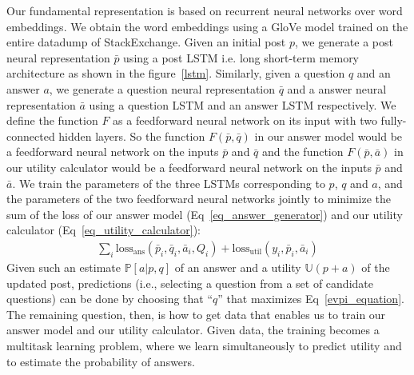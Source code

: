 \documentclass[11pt]{article}
\newcommand{\U}{\mathbb{U}}
\begin{document}
Our fundamental representation is based on recurrent neural networks over word embeddings. We obtain the word embeddings using a GloVe \cite{pennington2014glove} model trained on the entire datadump of StackExchange. Given an initial post $p$, we generate a post neural representation $\bar{p}$ using a post LSTM i.e. long short-term memory architecture \cite{hochreiter1997long} as shown in the figure~\ref{lstm}. Similarly, given a question $q$ and an answer $a$, we generate a question neural representation $\bar{q}$ and a answer neural representation $\bar{a}$ using a question LSTM and an answer LSTM respectively. We define the function $F$ as a feedforward neural network on its input with two fully-connected hidden layers. So the function $F(\bar{p},\bar{q})$ in our answer model would be a feedforward neural network on the inputs $\bar{p}$ and $\bar{q}$ and the function $F(\bar{p}, \bar{a})$ in our utility calculator would be a feedforward neural network on the inputs $\bar{p}$ and $\bar{a}$. We train the parameters of the three LSTMs corresponding to $p$, $q$ and $a$, and the parameters of the two feedforward neural networks jointly to minimize the sum of the loss of our answer model (Eq~\ref{eq_answer_generator}) and our utility calculator (Eq~\ref{eq_utility_calculator}):
%
\begin{align}
                       \sum_i \textrm{loss}_{\textrm{ans}}(\bar p_i, \bar q_i, \bar a_i, Q_i)  
                        +  \textrm{loss}_{\textrm{util}}(y_i, \bar p_i, \bar a_i)
\end{align}
%
Given such an estimate $\mathbb{P}[a|p,q]$ of an answer and a utility $\U(p+a)$ of the updated post, predictions (i.e., selecting a question from a set of candidate questions) can be done by choosing that ``$q$'' that maximizes Eq~\ref{evpi_equation}. The remaining question, then, is how to get data that enables us to train our answer model and our utility calculator. Given data, the training becomes a multitask learning problem, where we learn simultaneously to predict utility and to estimate the probability of answers.
\end{document}
